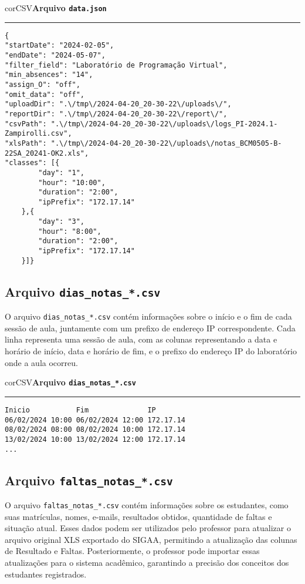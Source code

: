 \begin{myboxCode}{corCSV}{\textbf{Arquivo \texttt{data.json}}}\vspace{3mm}
\hrule
\begin{verbatim}
{
"startDate": "2024-02-05",
"endDate": "2024-05-07",
"filter_field": "Laboratório de Programação Virtual",
"min_absences": "14",
"assign_O": "off",
"omit_data": "off",
"uploadDir": ".\/tmp\/2024-04-20_20-30-22\/uploads\/",
"reportDir": ".\/tmp\/2024-04-20_20-30-22\/report\/",
"csvPath": ".\/tmp\/2024-04-20_20-30-22\/uploads\/logs_PI-2024.1-Zampirolli.csv",
"xlsPath": ".\/tmp\/2024-04-20_20-30-22\/uploads\/notas_BCM0505-B-22SA_20241-OK2.xls",
"classes": [{
        "day": "1",
        "hour": "10:00",
        "duration": "2:00",
        "ipPrefix": "172.17.14"
    },{
        "day": "3",
        "hour": "8:00",
        "duration": "2:00",
        "ipPrefix": "172.17.14"
    }]}
\end{verbatim}
\end{myboxCode}

\subsection{Arquivo \texttt{dias\_notas\_*.csv}}

O arquivo \texttt{dias\_notas\_*.csv} contém informações sobre o início e o fim de cada sessão de aula, juntamente com um prefixo de endereço IP correspondente. Cada linha representa uma sessão de aula, com as colunas representando a data e horário de início, data e horário de fim, e o prefixo do endereço IP do laboratório onde a aula ocorreu.

\begin{myboxCode}{corCSV}{\textbf{Arquivo \texttt{dias\_notas\_*.csv}}}\vspace{3mm}
    \hrule
    \begin{verbatim}
Inicio           Fim              IP
06/02/2024 10:00 06/02/2024 12:00 172.17.14
08/02/2024 08:00 08/02/2024 10:00 172.17.14
13/02/2024 10:00 13/02/2024 12:00 172.17.14
...
\end{verbatim}
\end{myboxCode}

\subsection{Arquivo \texttt{faltas\_notas\_*.csv}}

O arquivo \texttt{faltas\_notas\_*.csv} contém informações sobre os estudantes, como suas matrículas, nomes, e-mails, resultados obtidos, quantidade de faltas e situação atual. Esses dados podem ser utilizados pelo professor para atualizar o arquivo original XLS exportado do SIGAA, permitindo a atualização das colunas de Resultado e Faltas. Posteriormente, o professor pode importar essas atualizações para o sistema acadêmico, garantindo a precisão dos conceitos dos estudantes registrados.

